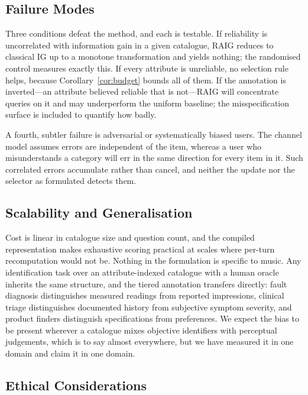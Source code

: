 \documentclass[conference]{IEEEtran}
\begin{document}
\subsection{Failure Modes}

Three conditions defeat the method, and each is testable. If reliability is
uncorrelated with information gain in a given catalogue, RAIG reduces to
classical IG up to a monotone transformation and yields nothing; the randomised
control measures exactly this. If every attribute is unreliable, no selection
rule helps, because Corollary~\ref{cor:budget} bounds all of them. If the
annotation is inverted---an attribute believed reliable that is not---RAIG will
concentrate queries on it and may underperform the uniform baseline; the
misspecification surface is included to quantify how badly.

A fourth, subtler failure is adversarial or systematically biased users. The
channel model assumes errors are independent of the item, whereas a user who
misunderstands a category will err in the same direction for every item in it.
Such correlated errors accumulate rather than cancel, and neither the update
nor the selector as formulated detects them.

\subsection{Scalability and Generalisation}

Cost is linear in catalogue size and question count, and the compiled
representation makes exhaustive scoring practical at scales where per-turn
recomputation would not be. Nothing in the formulation is specific to music.
Any identification task over an attribute-indexed catalogue with a human oracle
inherits the same structure, and the tiered annotation transfers directly: fault
diagnosis distinguishes measured readings from reported impressions, clinical
triage distinguishes documented history from subjective symptom severity, and
product finders distinguish specifications from preferences. We expect the bias
to be present wherever a catalogue mixes objective identifiers with perceptual
judgements, which is to say almost everywhere, but we have measured it in one
domain and claim it in one domain.

\subsection{Ethical Considerations}
\end{document}
